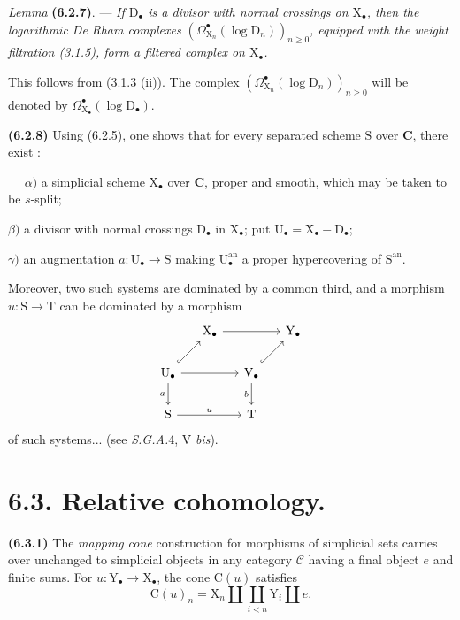 \documentclass[11pt,leqno]{article}
\newcommand{\Page}[1]{\ifvmode\noindent\else\unskip\ \fi{\footnotesize\textcolor{gray}{[p.\,#1]}}\ \ignorespaces}
\begin{document}
\textit{Lemma} \textbf{(6.2.7)}. — \textit{If \(\mathrm{D}_{\bullet}\) is a divisor with normal crossings on \(\mathrm{X}_{\bullet}\), then the logarithmic De Rham complexes \((\Omega_{\mathrm{X}_n}^{\bullet}(\log\mathrm{D}_n))_{n\geq 0}\), equipped with the weight filtration \textup{(3.1.5)}, form a filtered complex on \(\mathrm{X}_{\bullet}\).}

This follows from (3.1.3 (ii)). The complex \((\Omega_{\mathrm{X}_n}^{\bullet}(\log\mathrm{D}_n))_{n\geq 0}\) will be denoted by \(\Omega_{\mathrm{X}_{\bullet}}^{\bullet}(\log\mathrm{D}_{\bullet})\).

\textbf{(6.2.8)} Using (6.2.5), one shows that for every separated scheme \(\mathrm{S}\) over \(\mathbf{C}\), there exist :

\Page{21}
\noindent
\(\alpha)\) a simplicial scheme \(\mathrm{X}_{\bullet}\) over \(\mathbf{C}\), proper and smooth, which may be taken to be \(s\)-split;

\noindent
\(\beta)\) a divisor with normal crossings \(\mathrm{D}_{\bullet}\) in \(\mathrm{X}_{\bullet}\); put \(\mathrm{U}_{\bullet}=\mathrm{X}_{\bullet}-\mathrm{D}_{\bullet}\);

\noindent
\(\gamma)\) an augmentation \(a:\mathrm{U}_{\bullet}\to\mathrm{S}\) making \(\mathrm{U}_{\bullet}^{\mathrm{an}}\) a proper hypercovering of \(\mathrm{S}^{\mathrm{an}}\).

Moreover, two such systems are dominated by a common third, and a morphism \(u:\mathrm{S}\to\mathrm{T}\) can be dominated by a morphism
\[
\begin{tikzcd}[column sep=1.3em,row sep=1.8em]
& \mathrm{X}_{\bullet} \arrow[rr] & & \mathrm{Y}_{\bullet} \\
\mathrm{U}_{\bullet} \arrow[ur,hook] \arrow[rr] \arrow[d,"a"']
& & \mathrm{V}_{\bullet} \arrow[ur,hook] \arrow[d,"b"'] & \\
\mathrm{S} \arrow[rr,"u"] & & \mathrm{T} &
\end{tikzcd}
\]
of such systems... (see \textit{S.G.A.}4, V \textit{bis}).

\section*{6.3. Relative cohomology.}

\textbf{(6.3.1)} The \textit{mapping cone} construction for morphisms of simplicial sets carries over unchanged to simplicial objects in any category \(\mathscr{C}\) having a final object \(e\) and finite sums. For \(u:\mathrm{Y}_{\bullet}\to\mathrm{X}_{\bullet}\), the cone \(\mathrm{C}(u)\) satisfies
\[
\mathrm{C}(u)_n
=\mathrm{X}_n\amalg\coprod_{i<n}\mathrm{Y}_i\amalg e.
\]
\end{document}
